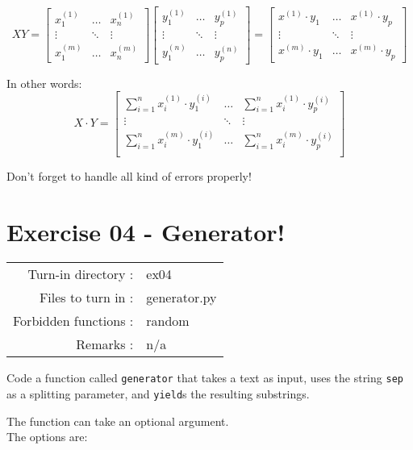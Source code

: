 \documentclass[]{article}
\begin{document}
\[
X  Y = 
\begin{bmatrix} 
x_{1}^{(1)} & \dots & x_{n}^{(1)}  \\ 
\vdots & \ddots & \vdots \\ 
x_{1}^{(m)} & \dots & x_{n}^{(m)} 
\end{bmatrix}  
\begin{bmatrix} 
y_{1}^{(1)} & \dots & y_{p}^{(1)}  \\ 
\vdots & \ddots & \vdots \\ 
y_{1}^{(n)} & \dots & y_{p}^{(n)} 
\end{bmatrix} = 
\begin{bmatrix} 
x^{(1)} \cdot y_1  & \dots & x^{(1)} \cdot y_{p} \\ 
\vdots & \ddots & \vdots \\ 
x^{(m)} \cdot y_1 & \dots & x^{(m)} \cdot y_{p}
\end{bmatrix}
\] \normalsize

In other words: ​ \large \[
X \cdot Y = 
\begin{bmatrix} 
\sum_{i = 1}^{n} x_{i}^{(1)} \cdot y_{1}^{(i)} & \dots & \sum_{i=1}^{n} x_{i}^{(1)} \cdot y_{p}^{(i)} \\
\vdots & \ddots & \vdots \\ 
\sum_{i = 1}^{n} x_{i}^{(m)} \cdot y_{1}^{(i)} & \dots & \sum_{i=1}^{n} x_{i}^{(m)} \cdot y_{p}^{(i)} \\
\end{bmatrix}
\] \normalsize

Don't forget to handle all kind of errors properly!

\clearpage

\hypertarget{exercise-04---generator-1}{%
\section{Exercise 04 - Generator!}\label{exercise-04---generator-1}}

\begin{longtable}[]{@{}rl@{}}
\toprule
\endhead
Turn-in directory : & ex04\tabularnewline
Files to turn in : & generator.py\tabularnewline
Forbidden functions : & random\tabularnewline
Remarks : & n/a\tabularnewline
\bottomrule
\end{longtable}

Code a function called \texttt{generator} that takes a text as input,
uses the string \texttt{sep} as a splitting parameter, and
\texttt{yield}s the resulting substrings.

The function can take an optional argument.\\
The options are:
\end{document}
